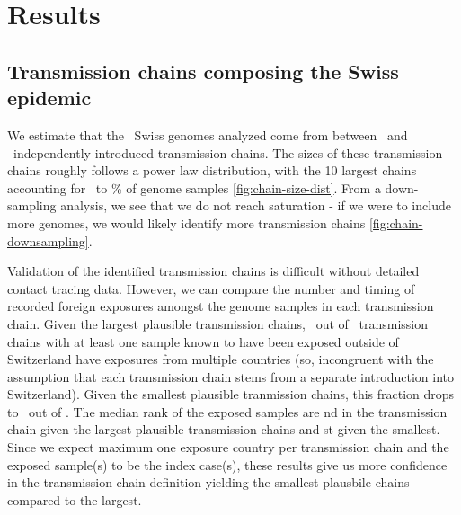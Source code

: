 \documentclass[9pt,twocolumn,twoside,lineno]{pnas-new}
\begin{document}
\section{Results}

\subsection{Transmission chains composing the Swiss epidemic}

We estimate that the \nswissseqs\ Swiss genomes analyzed come from between \nchainsmin\ and \nchainsmax\ independently introduced transmission chains. The sizes of these transmission chains roughly follows a power law distribution, with the 10 largest chains accounting for \maxlargestchainsper\ to \minlargestchainsper \% of genome samples \ref{fig:chain-size-dist}. From a down-sampling analysis, we see that we do not reach saturation - if we were to include more genomes, we would likely identify more transmission chains \ref{fig:chain-downsampling}. 

Validation of the identified transmission chains is difficult without detailed contact tracing data. However, we can compare the number and timing of recorded foreign exposures amongst the genome samples in each transmission chain. Given the largest plausible transmission chains, \ncinongruentexposurechainsmin\ out of \nexposurechainsmin\ transmission chains with at least one sample known to have been exposed outside of Switzerland have exposures from multiple countries (so, incongruent with the assumption that each transmission chain stems from a separate introduction into Switzerland). Given the smallest plausible tranmission chains, this fraction drops to \ncinongruentexposurechainsmax\ out of \nexposurechainsmax. The median rank of the exposed samples are  \rankexpsamplemin nd in the transmission chain given the largest plausible transmission chains and \rankexpsamplemax st given the smallest. Since we expect maximum one exposure country per transmission chain and the exposed sample(s) to be the index case(s), these results give us more confidence in the transmission chain definition yielding the smallest plausbile chains compared to the largest.

\end{document}
